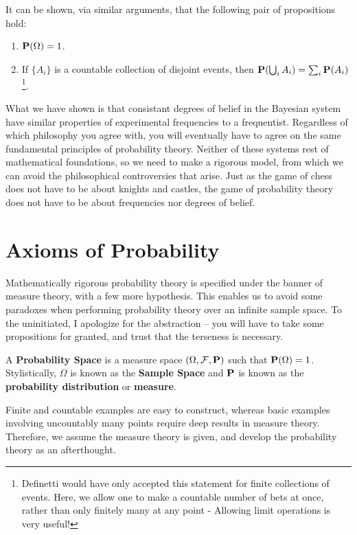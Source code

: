 It can be shown, via similar arguments, that the following pair of propositions hold:
%
\begin{enumerate}
    \item $\operatorname{\mathbf{P}}(\Omega) = 1$.
    \item If $\{ A_i \}$ is a countable collection of disjoint events, then $\operatorname{\mathbf{P}}(\bigcup_i A_i) = \sum_i \operatorname{\mathbf{P}}(A_i)$\footnote{Definetti would have only accepted this statement for finite collections of events. Here, we allow one to make a countable number of bets at once, rather than only finitely many at any point - Allowing limit operations is very useful!}.
\end{enumerate}
%
What we have shown is that consistant degrees of belief in the Bayesian system have similar properties of experimental frequencies to a frequentist. Regardless of which philosophy you agree with, you will eventually have to agree on the same fundamental principles of probability theory. Neither of these systems rest of mathematical foundations, so we need to make a rigorous model, from which we can avoid the philosophical controversies that arise. Just as the game of chess does not have to be about knights and castles, the game of probability theory does not have to be about frequencies nor degrees of belief.

\section{Axioms of Probability}

Mathematically rigorous probability theory is specified under the banner of measure theory, with a few more hypothesis. This enables us to avoid some paradoxes when performing probability theory over an infinite sample space. To the uninitiated, I apologize for the abstraction -- you will have to take some propositions for granted, and trust that the terseness is necessary.

\begin{definition}
    A {\bf Probability Space} is a measure space $(\Omega, \mathcal{F}, \operatorname{\mathbf{P}})$ such that $\operatorname{\mathbf{P}}(\Omega) = 1$. Stylistically,
    $\Omega$ is known as the {\bf Sample Space} and $\operatorname{\mathbf{P}}$ is known as the {\bf probability distribution} or {\bf measure}.
\end{definition}

Finite and countable examples are easy to construct, whereas basic examples involving uncountably many points require deep results in measure theory. Therefore, we assume the measure theory is given, and develop the probability theory as an afterthought.


